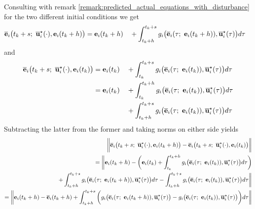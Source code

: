 \begin{gg_box}
Consulting with remark \eqref{remark:predicted_actual_equations_with_disturbance}
for the two different initial conditions we get
\begin{alignat}{2}
  \overline{\vect{e}}_i\big(t_k + s;\ \overline{\vect{u}}_i^{\star}(\cdot), \vect{e}_i(t_k +h)\big)
    &= \vect{e}_i(t_k +h)
    &&+ \int_{t_k +h}^{t_k + s} g_i\big(\overline{\vect{e}}_i(\tau;\ \vect{e}_i(t_k + h)), \overline{\vect{u}}_i^{\star}(\tau)\big) d\tau
\end{alignat}
and
\begin{alignat}{2}
  \overline{\vect{e}}_i\big(t_k + s;\ \overline{\vect{u}}_i^{\star}(\cdot), \vect{e}_i(t_k)\big)
    &= \vect{e}_i(t_k)
    &&+ \int_{t_k}^{t_k + s} g_i\big(\overline{\vect{e}}_i(\tau;\ \vect{e}_i(t_k)), \overline{\vect{u}}_i^{\star}(\tau)\big) d\tau \\
  &= \vect{e}_i(t_k)
    &&+ \int_{t_k}^{t_k + h} g_i\big(\overline{\vect{e}}_i(\tau;\ \vect{e}_i(t_k)), \overline{\vect{u}}_i^{\star}(\tau)\big) d\tau \\
  & &&+ \int_{t_k + h}^{t_k + s} g_i\big(\overline{\vect{e}}_i(\tau;\ \vect{e}_i(t_k)), \overline{\vect{u}}_i^{\star}(\tau)\big) d\tau
\end{alignat}
Subtracting the latter from the former and taking norms on either side yields
\begin{align}
  \bigg \| \overline{\vect{e}}_i\big(t_k + s;\ \overline{\vect{u}}_i^{\star}(\cdot), \vect{e}_i(t_k +h)\big)
    -\overline{\vect{e}}_i\big(t_k + s;\ \overline{\vect{u}}_i^{\star}(\cdot), \vect{e}_i(t_k)\big) \bigg \| \\
 = \bigg\| \vect{e}_i(t_k +h)
 - \bigg( \vect{e}_i(t_k) + \int_{t_k}^{t_k + h} g_i\big(\overline{\vect{e}}_i(\tau;\ \vect{e}_i(t_k)), \overline{\vect{u}}_i^{\star}(\tau)\big) d\tau \bigg) \\
    + \int_{t_k +h}^{t_k + s} g_i\big(\overline{\vect{e}}_i(\tau;\ \vect{e}_i(t_k + h)), \overline{\vect{u}}_i^{\star}(\tau)\big) d\tau
    - \int_{t_k + h}^{t_k + s} g_i\big(\overline{\vect{e}}_i(\tau;\ \vect{e}_i(t_k)), \overline{\vect{u}}_i^{\star}(\tau)\big) d\tau \bigg\| \\
    = \bigg\| \vect{e}_i(t_k +h) - \overline{\vect{e}}_i(t_k + h)
    + \int_{t_k +h}^{t_k + s} \bigg( g_i\big(\overline{\vect{e}}_i(\tau;\ \vect{e}_i(t_k + h)), \overline{\vect{u}}_i^{\star}(\tau)\big)
    -  g_i\big(\overline{\vect{e}}_i(\tau;\ \vect{e}_i(t_k)), \overline{\vect{u}}_i^{\star}(\tau)\big) \bigg) d\tau \bigg\| \\

\end{align}
\end{gg_box}
